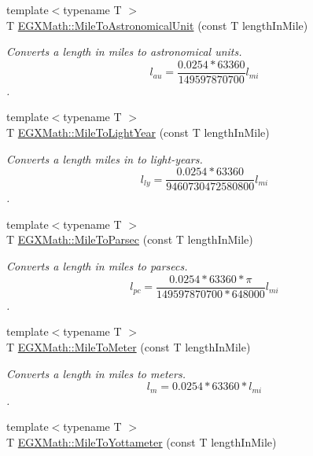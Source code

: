 \begin{DoxyCompactItemize}
\item 
{\footnotesize template$<$typename T $>$ }\\T \mbox{\hyperlink{group___e_g_x_math-_conversions-_length_conversions-_imperial-_mile-_astronomical_gae83082376f6746dd5f85433daad42331}{E\+G\+X\+Math\+::\+Mile\+To\+Astronomical\+Unit}} (const T length\+In\+Mile)
\begin{DoxyCompactList}\small\item\em Converts a length in miles to astronomical units. \[ l_{au}=\frac{0.0254 * 63360}{149597870700} l_{mi} \]. \end{DoxyCompactList}\item 
{\footnotesize template$<$typename T $>$ }\\T \mbox{\hyperlink{group___e_g_x_math-_conversions-_length_conversions-_imperial-_mile-_astronomical_ga45c1f0177f23bf7b798344319fb86909}{E\+G\+X\+Math\+::\+Mile\+To\+Light\+Year}} (const T length\+In\+Mile)
\begin{DoxyCompactList}\small\item\em Converts a length miles in to light-\/years. \[ l_{ly}=\frac{0.0254 * 63360}{9460730472580800} l_{mi} \]. \end{DoxyCompactList}\item 
{\footnotesize template$<$typename T $>$ }\\T \mbox{\hyperlink{group___e_g_x_math-_conversions-_length_conversions-_imperial-_mile-_astronomical_ga0f9493a3ad61ed0ddfa411b3f8edf6dc}{E\+G\+X\+Math\+::\+Mile\+To\+Parsec}} (const T length\+In\+Mile)
\begin{DoxyCompactList}\small\item\em Converts a length in miles to parsecs. \[ l_{pc}=\frac{0.0254 * 63360 * \pi}{149597870700 * 648000} l_{mi} \]. \end{DoxyCompactList}\item 
{\footnotesize template$<$typename T $>$ }\\T \mbox{\hyperlink{group___e_g_x_math-_conversions-_length_conversions-_imperial-_mile-_s_i_ga39ebb5e23ea39eb97487dfcd5454c062}{E\+G\+X\+Math\+::\+Mile\+To\+Meter}} (const T length\+In\+Mile)
\begin{DoxyCompactList}\small\item\em Converts a length in miles to meters. \[ l_{m}=0.0254 * 63360 * l_{mi} \]. \end{DoxyCompactList}\item 
{\footnotesize template$<$typename T $>$ }\\T \mbox{\hyperlink{group___e_g_x_math-_conversions-_length_conversions-_imperial-_mile-_s_i_ga26416c1c62f8b0c2cb290f4c984e8a42}{E\+G\+X\+Math\+::\+Mile\+To\+Yottameter}} (const T length\+In\+Mile)

\end{DoxyCompactItemize}
